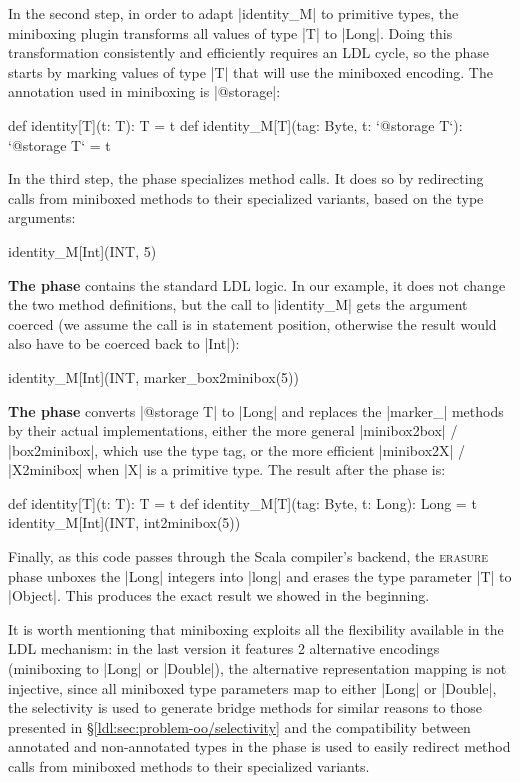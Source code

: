 In the second step, in order to adapt |identity_M| to primitive types, the miniboxing plugin transforms all values of type |T| to |Long|. Doing this transformation consistently and efficiently requires an LDL cycle, so the \inject{} phase starts by marking values of type |T| that will use the miniboxed encoding. The annotation used in miniboxing is |@storage|:

\begin{lstlisting-nobreak}
 def identity[T](t: T): T = t
 def identity_M[T](tag: Byte, t: `@storage T`): `@storage T` = t
\end{lstlisting-nobreak}

In the third step, the \inject{} phase specializes method calls. It does so by redirecting calls from miniboxed methods to their specialized variants, based on the type arguments:

\begin{lstlisting-nobreak}
 identity_M[Int](INT, 5)
\end{lstlisting-nobreak}

\textbf{The \coerce{} phase} contains the standard LDL logic. In our example, it does not change the two method definitions, but the call to |identity_M| gets the argument coerced (we assume the call is in statement position, otherwise the result would also have to be coerced back to |Int|):

\begin{lstlisting-nobreak}
 identity_M[Int](INT, marker_box2minibox(5))
\end{lstlisting-nobreak}

\textbf{The \commit{} phase} converts |@storage T| to |Long| and replaces the |marker_| methods by their actual implementations, either the more general |minibox2box| / |box2minibox|, which use the type tag, or the more efficient |minibox2X| / |X2minibox| when |X| is a primitive type. The result after the \commit{} phase is:

\begin{lstlisting-nobreak}
 def identity[T](t: T): T = t
 def identity_M[T](tag: Byte, t: Long): Long = t
 identity_M[Int](INT, int2minibox(5))
\end{lstlisting-nobreak}

Finally, as this code passes through the Scala compiler's backend, the \textsc{erasure} phase unboxes the |Long| integers into |long| and erases the type parameter |T| to |Object|. This produces the exact result we showed in the beginning.

It is worth mentioning that miniboxing exploits all the flexibility available in the LDL mechanism: in the last version it features 2 alternative encodings (miniboxing to |Long| or |Double|), the alternative representation mapping is not injective, since all miniboxed type parameters map to either |Long| or |Double|, the selectivity is used to generate bridge methods for similar reasons to those presented in \S\ref{ldl:sec:problem-oo/selectivity} and the compatibility between annotated and non-annotated types in the \inject{} phase is used to easily redirect method calls from miniboxed methods to their specialized variants.

